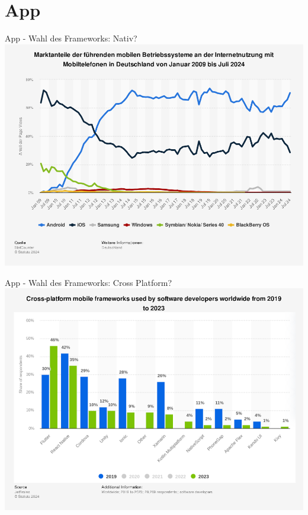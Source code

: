 %
%
\section{App}

\begin{frame}{App - Wahl des Frameworks: Nativ?}
	\centering
	\includegraphics[height=1.0\textheight]{images/app/flutter/statista_mobile.png}
\end{frame}

\begin{frame}{App - Wahl des Frameworks: Cross Platform?}
	\centering
	\includegraphics[height=1.0\textheight]{images/app/flutter/cross_platform_statista.png}
\end{frame}

